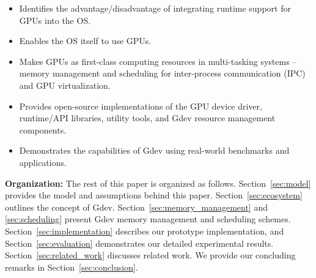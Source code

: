 \begin{itemize}
 \vspace{-0.25em}
 \item Identifies the advantage/disadvantage of integrating runtime
       support for GPUs into the OS.
 \vspace{-0.5em}
 \item Enables the OS itself to use GPUs.
 \vspace{-0.5em}
 \item Makes GPUs as first-class computing resources in multi-tasking
       systems -- memory management and scheduling for inter-process
       communication (IPC) and GPU virtualization.
 \vspace{-0.5em}
 \item Provides open-source implementations of the GPU device driver,
       runtime/API libraries, utility tools, and Gdev resource
       management components.
 \vspace{-0.5em}
 \item Demonstrates the capabilities of Gdev using real-world benchmarks
       and applications.
 \vspace{-0.25em}
\end{itemize}

\textbf{Organization:}
The rest of this paper is organized as follows.
Section~\ref{sec:model} provides the model and assumptions behind
this paper.
Section~\ref{sec:ecosystem} outlines the concept of Gdev.
Section~\ref{sec:memory_management} and \ref{sec:scheduling} present
Gdev memory management and scheduling schemes.
Section~\ref{sec:implementation} describes our prototype implementation,
and Section~\ref{sec:evaluation} demonstrates our detailed experimental
results.
Section~\ref{sec:related_work} discusses related work.
We provide our concluding remarks in Section~\ref{sec:conclusion}.

